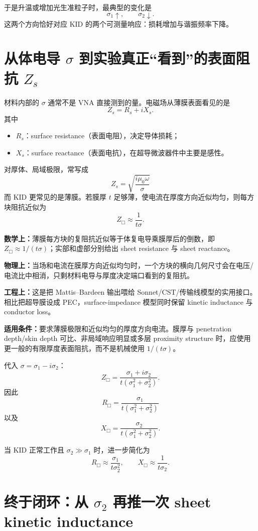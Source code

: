 \documentclass[11pt,a4paper,openany]{ctexrep}
\newcommand{\formulaexplain}[4]{%
\begin{formulaguidebox}
\textbf{\color{KidBlue}数学上：}#1\par
\textbf{\color{KidTeal}物理上：}#2\par
\textbf{\color{KidGold!55!black}工程上：}#3\par
\textbf{\color{KidRed}适用条件：}#4
\end{formulaguidebox}%
}
\begin{document}
于是升温或增加光生准粒子时，最典型的变化是
\[
\boxed{
\sigma_1\uparrow,
\qquad
\sigma_2\downarrow.
}
\]
这两个方向恰好对应 KID 的两个可测量响应：损耗增加与谐振频率下降。

\section{从体电导 $\sigma$ 到实验真正“看到”的表面阻抗 $Z_s$}

材料内部的 $\sigma$ 通常不是 VNA 直接测到的量。电磁场从薄膜表面看见的是
\[
\boxed{
Z_s=R_s+iX_s.
}
\]
其中
\begin{itemize}
  \item $R_s$：surface resistance（表面电阻），决定导体损耗；
  \item $X_s$：surface reactance（表面电抗），在超导微波器件中主要是感性。
\end{itemize}

对厚体、局域极限，常写成
\[
\boxed{
Z_s=\sqrt{\frac{i\mu_0\omega}{\sigma}}
}
\]
而 KID 更常见的是薄膜。若膜厚 $t$ 足够薄，使电流在厚度方向近似均匀，则每方块阻抗近似为
\[
\boxed{
Z_{\Box}
\approx
\frac{1}{t\sigma}.
}
\]
\formulaexplain
{薄膜每方块的复阻抗近似等于体复电导乘膜厚后的倒数，即 $Z_{\Box}\approx1/(t\sigma)$；实部和虚部分别给出 sheet resistance 与 sheet reactance。}
{当场和电流在膜厚方向近似均匀时，一个方块的横向几何尺寸会在电压/电流比中相消，只剩材料电导与厚度决定端口看到的复阻抗。}
{这是把 Mattis--Bardeen 输出喂给 Sonnet/CST/传输线模型的实用接口。相比把超导膜设成 PEC，surface-impedance 模型同时保留 kinetic inductance 与 conductor loss。}
{要求薄膜极限和近似均匀的厚度方向电流。膜厚与 penetration depth/skin depth 可比、非局域响应明显或多层 proximity structure 时，应使用更一般的有限厚度表面阻抗，而不是机械使用 $1/(t\sigma)$。}

代入 $\sigma=\sigma_1-i\sigma_2$：
\[
Z_{\Box}
=
\frac{\sigma_1+i\sigma_2}
{t(\sigma_1^2+\sigma_2^2)}.
\]
因此
\[
\boxed{
R_{\Box}
=
\frac{\sigma_1}
{t(\sigma_1^2+\sigma_2^2)}
}
\]
以及
\[
\boxed{
X_{\Box}
=
\frac{\sigma_2}
{t(\sigma_1^2+\sigma_2^2)}.
}
\]

当 KID 正常工作且 $\sigma_2\gg\sigma_1$ 时，进一步简化为
\[
\boxed{
R_{\Box}\approx\frac{\sigma_1}{t\sigma_2^2},
\qquad
X_{\Box}\approx\frac{1}{t\sigma_2}.
}
\]

\section{终于闭环：从 $\sigma_2$ 再推一次 sheet kinetic inductance}
\end{document}
